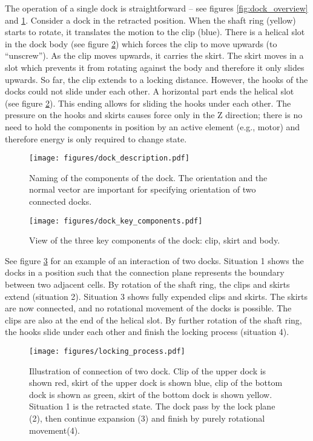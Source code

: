 The operation of a single dock is straightforward -- see figures
\ref{fig:dock_overview} and \ref{fig:dock_description}. Consider a dock in the
retracted position. When the shaft ring (yellow) starts to rotate, it translates
the motion to the clip (blue). There is a helical slot in the dock body (see
figure \ref{fig:dock_key_components}) which forces the clip to move upwards (to
``unscrew''). As the clip moves upwards, it carries the skirt. The skirt moves
in a slot which prevents it from rotating against the body and therefore it only
slides upwards. So far, the clip extends to a locking distance. However, the
hooks of the docks could not slide under each other. A horizontal part ends the
helical slot (see figure \ref{fig:dock_key_components}). This ending allows for
sliding the hooks under each other. The pressure on the hooks and skirts causes
force only in the Z direction; there is no need to hold the components in
position by an active element (e.g., motor) and therefore energy is only
required to change state.

\begin{figure}[t]
    \centering
    \texttt{[image: figures/dock\_description.pdf]}
    \caption{Naming of the components of the dock. The orientation and the
    normal vector are important for specifying orientation of two connected
    docks. }
    \label{fig:dock_description}
\end{figure}

\begin{figure}[t]
    \centering
    \texttt{[image: figures/dock\_key\_components.pdf]}
    \caption{View of the three key components of the dock: clip, skirt and body.}
    \label{fig:dock_key_components}
\end{figure}

See figure \ref{fig:dock_locking_process} for an example of an interaction of
two docks. Situation 1 shows the docks in a position such that the connection
plane represents the boundary between two adjacent cells. By rotation of the
shaft ring, the clips and skirts extend (situation 2). Situation 3 shows fully
expended clips and skirts. The skirts are now connected, and no rotational
movement of the docks is possible. The clips are also at the end of the helical
slot. By further rotation of the shaft ring, the hooks slide under each other
and finish the locking process (situation 4).

\begin{figure}[!ht]
    \centering
    \texttt{[image: figures/locking\_process.pdf]}
    \caption{Illustration of connection of two dock. Clip of the upper dock is
    shown red, skirt of the upper dock is shown blue, clip of the bottom dock is
    shown as green, skirt of the bottom dock is shown yellow.  Situation 1 is
    the retracted state. The dock pass by the lock plane (2), then continue
    expansion (3) and finish by purely rotational movement(4). }
    \label{fig:dock_locking_process}
\end{figure}

